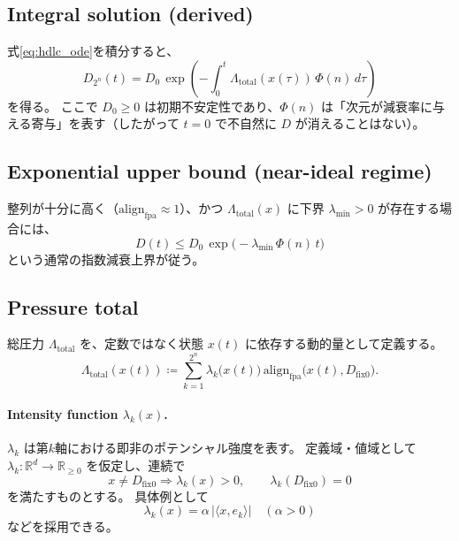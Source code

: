 \documentclass[12pt,a4paper]{article}
\newcommand{\dfix}{D_{\text{fix0}}}
\begin{document}
\subsection{Integral solution (derived)}
式\eqref{eq:hdlc_ode}を積分すると、
\begin{equation}
  D_{2^n}(t) = D_0\,\exp\left(-\int_{0}^{t} \Lambda_{\mathrm{total}}(x(\tau))\,\Phi(n)\,d\tau\right)
  \label{eq:hdlc}
\end{equation}
を得る。
ここで $D_0 \ge 0$ は初期不安定性であり、$\Phi(n)$ は「次元が減衰率に与える寄与」を表す（したがって $t=0$ で不自然に $D$ が消えることはない）。

\subsection{Exponential upper bound (near-ideal regime)}
整列が十分に高く（$\mathrm{align}_{\mathrm{fpa}}\approx 1$）、かつ $\Lambda_{\mathrm{total}}(x)$ に下界 $\lambda_{\min}>0$ が存在する場合には、
\begin{equation}
  D(t) \le D_0\,\exp\bigl(-\lambda_{\min}\,\Phi(n)\,t\bigr)
  \label{eq:hdlc_bound}
\end{equation}
という通常の指数減衰上界が従う。

\subsection{Pressure total}
総圧力 $\Lambda_{\mathrm{total}}$ を、定数ではなく状態 $x(t)$ に依存する動的量として定義する。
\begin{equation}
  \Lambda_{\mathrm{total}}(x(t)) \coloneqq \sum_{k=1}^{2^n} \lambda_k\bigl(x(t)\bigr)\,\mathrm{align}_{\mathrm{fpa}}\bigl(x(t),\dfix\bigr).
  \label{eq:lambda_total}
\end{equation}

\paragraph{Intensity function $\lambda_k(x)$.}
$\lambda_k$ は第$k$軸における即非のポテンシャル強度を表す。
定義域・値域として $\lambda_k: \mathbb{R}^d \to \mathbb{R}_{\ge 0}$ を仮定し、連続で
\begin{equation}
  x\neq \dfix \Rightarrow \lambda_k(x) > 0, \qquad \lambda_k(\dfix)=0
\end{equation}
を満たすものとする。
具体例として
\begin{equation}
  \lambda_k(x) = \alpha\,\bigl\lvert\langle x,e_k\rangle\bigr\rvert \quad (\alpha>0)
  \label{eq:lambda_example}
\end{equation}
などを採用できる。
\end{document}
